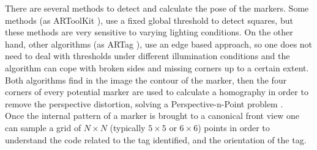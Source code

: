 There are several methods to detect and calculate the pose of the markers. Some methods (as ARToolKit \cite{kato1999marker}), use a fixed global threshold to detect squares, but these methods are very sensitive to varying lighting conditions. On the other hand, other algorithms (as ARTag \cite{fiala2010designing}), use an edge based approach, so one does not need to deal with thresholds under different illumination conditions and the algorithm can cope with broken sides and missing corners up to a certain extent. 
Both algorithms find in the image the contour of the marker, then the four corners of every potential marker are used to calculate a homography in order to remove the perspective distortion, solving a Perspective-n-Point problem \cite{quan1999linear}.\\
Once the internal pattern of a marker is brought to a canonical front view one can sample a grid of $N \times N$ (typically $5 \times 5$ or $6 \times 6$) points in order to understand the code related to the tag identified, and the orientation of the tag.

